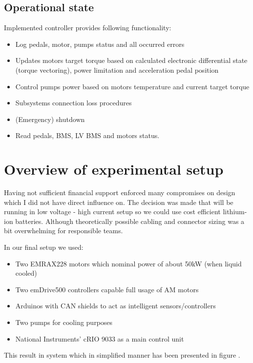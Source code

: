 
\subsection{Operational state}
Implemented controller provides following functionality:
\begin{itemize}
    \item Log pedals, motor, pumps status and all occurred errors
    \item Updates motors target torque based on calculated electronic differential state (torque vectoring), power limitation and acceleration pedal position
    \item Control pumps power based on motors temperature and current target torque
    \item Subsystems connection loss procedures
    \item (Emergency) shutdown
    \item Read pedals, BMS, LV BMS and motors status.
\end{itemize}


\section{Overview of experimental setup}
Having not sufficient financial support enforced many compromises on design which I did not have direct influence on. The decision was made that will be running in low voltage - high current setup so we could use cost efficient lithium-ion batteries. 
Although theoretically possible cabling and connector sizing was a bit overwhelming for responsible teams.

In our final setup we used:
\begin{itemize}
    \item Two EMRAX228 motors which nominal power of about 50kW (when liquid cooled)
    \item Two emDrive500 controllers capable full usage of AM motors
    \item Arduinos with CAN shields to act as intelligent sensors/controllers
    \item Two  pumps for cooling purposes
    \item National Instruments' cRIO 9033 as a main control unit
\end{itemize}

This result in system which in simplified manner has been presented in figure .

